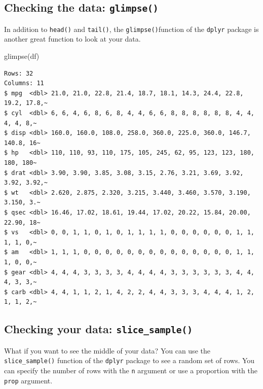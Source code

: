 \documentclass[
]{article}
\newenvironment{Shaded}{\begin{snugshade}}{\end{snugshade}}
\newcommand{\FunctionTok}[1]{\textcolor[rgb]{0.00,0.00,0.00}{#1}}
\newcommand{\NormalTok}[1]{#1}
\begin{document}
\hypertarget{checking-the-data-glimpse}{%
\subsection{\texorpdfstring{Checking the data:
\texttt{glimpse()}}{Checking the data: glimpse()}}\label{checking-the-data-glimpse}}

In addition to \texttt{head()} and \texttt{tail()}, the
\texttt{glimpse()}function of the \texttt{dplyr} package is another
great function to look at your data.

\begin{Shaded}
\begin{Highlighting}[]
\FunctionTok{glimpse}\NormalTok{(df)}
\end{Highlighting}
\end{Shaded}

\begin{verbatim}
Rows: 32
Columns: 11
$ mpg  <dbl> 21.0, 21.0, 22.8, 21.4, 18.7, 18.1, 14.3, 24.4, 22.8, 19.2, 17.8,~
$ cyl  <dbl> 6, 6, 4, 6, 8, 6, 8, 4, 4, 6, 6, 8, 8, 8, 8, 8, 8, 4, 4, 4, 4, 8,~
$ disp <dbl> 160.0, 160.0, 108.0, 258.0, 360.0, 225.0, 360.0, 146.7, 140.8, 16~
$ hp   <dbl> 110, 110, 93, 110, 175, 105, 245, 62, 95, 123, 123, 180, 180, 180~
$ drat <dbl> 3.90, 3.90, 3.85, 3.08, 3.15, 2.76, 3.21, 3.69, 3.92, 3.92, 3.92,~
$ wt   <dbl> 2.620, 2.875, 2.320, 3.215, 3.440, 3.460, 3.570, 3.190, 3.150, 3.~
$ qsec <dbl> 16.46, 17.02, 18.61, 19.44, 17.02, 20.22, 15.84, 20.00, 22.90, 18~
$ vs   <dbl> 0, 0, 1, 1, 0, 1, 0, 1, 1, 1, 1, 0, 0, 0, 0, 0, 0, 1, 1, 1, 1, 0,~
$ am   <dbl> 1, 1, 1, 0, 0, 0, 0, 0, 0, 0, 0, 0, 0, 0, 0, 0, 0, 1, 1, 1, 0, 0,~
$ gear <dbl> 4, 4, 4, 3, 3, 3, 3, 4, 4, 4, 4, 3, 3, 3, 3, 3, 3, 4, 4, 4, 3, 3,~
$ carb <dbl> 4, 4, 1, 1, 2, 1, 4, 2, 2, 4, 4, 3, 3, 3, 4, 4, 4, 1, 2, 1, 1, 2,~
\end{verbatim}

\hypertarget{checking-your-data-slice_sample}{%
\subsection{\texorpdfstring{Checking your data:
\texttt{slice\_sample()}}{Checking your data: slice\_sample()}}\label{checking-your-data-slice_sample}}

What if you want to see the middle of your data? You can use the
\texttt{slice\_sample()} function of the \texttt{dplyr} package to see a
random set of rows. You can specify the number of rows with the
\texttt{n} argument or use a proportion with the \texttt{prop} argument.
\end{document}
